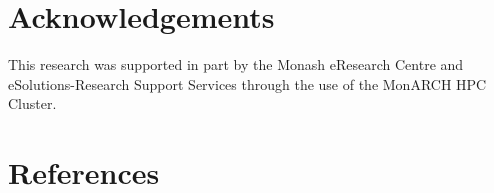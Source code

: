 \documentclass[authoryear,11pt,square,number,times,super,comma]{elsarticle}
\begin{document}
\section*{Acknowledgements}
 This research was supported in part by the Monash eResearch Centre and eSolutions-Research Support Services through the use of the MonARCH HPC Cluster.
\section*{References}

\end{document}
